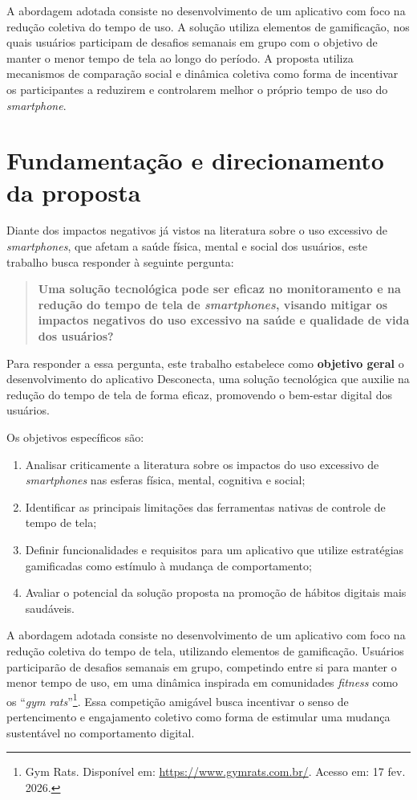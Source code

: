 A abordagem adotada consiste no desenvolvimento de um aplicativo com foco na redução coletiva do tempo de uso. A solução utiliza elementos de gamificação, nos quais usuários participam de desafios semanais em grupo com o objetivo de manter o menor tempo de tela ao longo do período. A proposta utiliza mecanismos de comparação social e dinâmica coletiva como forma de incentivar os participantes a reduzirem e controlarem melhor o próprio tempo de uso do \textit{smartphone}.

\section{Fundamentação e direcionamento da proposta}

Diante dos impactos negativos já vistos na literatura sobre o uso excessivo de \textit{smartphones}, que afetam a saúde física, mental e social dos usuários, este trabalho busca responder à seguinte pergunta:

\begin{quote}
\textbf{Uma solução tecnológica pode ser eficaz no monitoramento e na redução do tempo de tela de \textit{smartphones}, visando mitigar os impactos negativos do uso excessivo na saúde e qualidade de vida dos usuários?}
\end{quote}

Para responder a essa pergunta, este trabalho estabelece como \textbf{objetivo geral} o desenvolvimento do aplicativo Desconecta, uma solução tecnológica que auxilie na redução do tempo de tela de forma eficaz, promovendo o bem-estar digital dos usuários.

Os objetivos específicos são:

\begin{enumerate}[label=\Roman*.]
    \item Analisar criticamente a literatura sobre os impactos do uso excessivo de \textit{smartphones} nas esferas física, mental, cognitiva e social;
    \item Identificar as principais limitações das ferramentas nativas de controle de tempo de tela;
    \item Definir funcionalidades e requisitos para um aplicativo que utilize estratégias gamificadas como estímulo à mudança de comportamento;
    \item Avaliar o potencial da solução proposta na promoção de hábitos digitais mais saudáveis.
\end{enumerate}

A abordagem adotada consiste no desenvolvimento de um aplicativo com foco na redução coletiva do tempo de tela, utilizando elementos de gamificação. Usuários participarão de desafios semanais em grupo, competindo entre si para manter o menor tempo de uso, em uma dinâmica inspirada em comunidades \textit{fitness} como os ``\textit{gym rats}''\footnote{Gym Rats. Disponível em: \url{https://www.gymrats.com.br/}. Acesso em: 17 fev. 2026.}. Essa competição amigável busca incentivar o senso de pertencimento e engajamento coletivo como forma de estimular uma mudança sustentável no comportamento digital.

